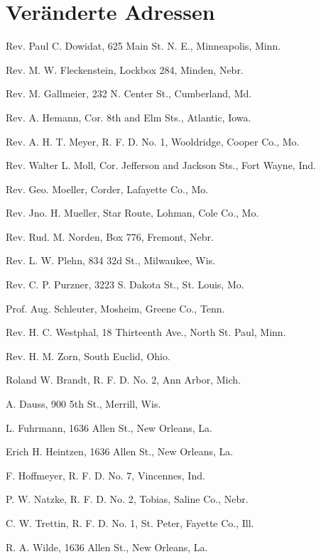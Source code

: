 \chapter{Veränderte Adressen}

Rev. Paul C. Dowidat, 625 Main St. N. E., Minneapolis, Minn.

Rev. M. W. Fleckenstein, Lockbox 284, Minden, Nebr.

Rev. M. Gallmeier, 232 N. Center St., Cumberland, Md.

Rev. A. Hemann, Cor. 8th and Elm Sts., Atlantic, Iowa.

Rev. A. H. T. Meyer, R. F. D. No. 1, Wooldridge, Cooper Co., Mo.

Rev. Walter L. Moll, Cor. Jefferson and Jackson Sts., Fort Wayne, Ind.

Rev. Geo. Moeller, Corder, Lafayette Co., Mo.

Rev. Jno. H. Mueller, Star Route, Lohman, Cole Co., Mo.

Rev. Rud. M. Norden, Box 776, Fremont, Nebr.

Rev. L. W. Plehn, 834 32d St., Milwaukee, Wis.

Rev. C. P. Purzner, 3223 S. Dakota St., St. Louis, Mo.

Prof. Aug. Schleuter, Mosheim, Greene Co., Tenn.

Rev. H. C. Westphal, 18 Thirteenth Ave., North St. Paul, Minn.

Rev. H. M. Zorn, South Euclid, Ohio.

Roland W. Brandt, R. F. D. No. 2, Ann Arbor, Mich.

A. Dauss, 900 5th St., Merrill, Wis.

L. Fuhrmann, 1636 Allen St., New Orleans, La.

Erich H. Heintzen, 1636 Allen St., New Orleans, La.

F. Hoffmeyer, R. F. D. No. 7, Vincennes, Ind.

P. W. Natzke, R. F. D. No. 2, Tobias, Saline Co., Nebr.

C. W. Trettin, R. F. D. No. 1, St. Peter, Fayette Co., Ill.

R. A. Wilde, 1636 Allen St., New Orleans, La.
